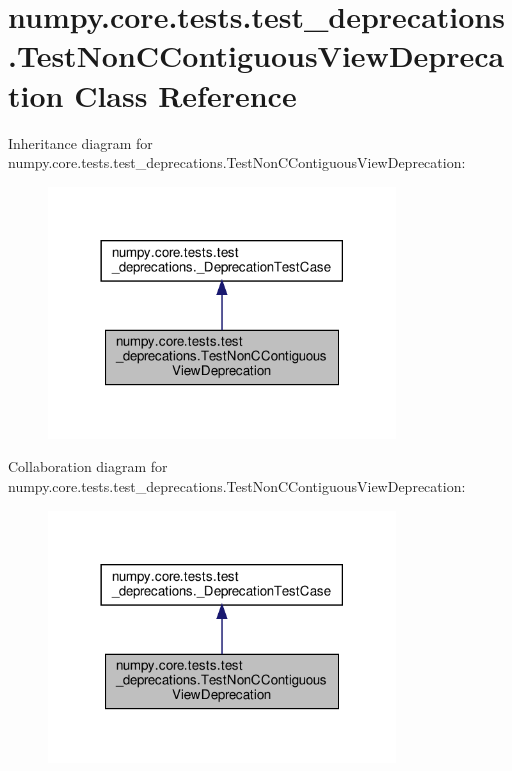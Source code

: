 \hypertarget{classnumpy_1_1core_1_1tests_1_1test__deprecations_1_1TestNonCContiguousViewDeprecation}{}\section{numpy.\+core.\+tests.\+test\+\_\+deprecations.\+Test\+Non\+C\+Contiguous\+View\+Deprecation Class Reference}
\label{classnumpy_1_1core_1_1tests_1_1test__deprecations_1_1TestNonCContiguousViewDeprecation}


Inheritance diagram for numpy.\+core.\+tests.\+test\+\_\+deprecations.\+Test\+Non\+C\+Contiguous\+View\+Deprecation\+:
\nopagebreak
\begin{figure}[H]
\begin{center}
\leavevmode
\includegraphics[width=261pt]{classnumpy_1_1core_1_1tests_1_1test__deprecations_1_1TestNonCContiguousViewDeprecation__inherit__graph}
\end{center}
\end{figure}


Collaboration diagram for numpy.\+core.\+tests.\+test\+\_\+deprecations.\+Test\+Non\+C\+Contiguous\+View\+Deprecation\+:
\nopagebreak
\begin{figure}[H]
\begin{center}
\leavevmode
\includegraphics[width=261pt]{classnumpy_1_1core_1_1tests_1_1test__deprecations_1_1TestNonCContiguousViewDeprecation__coll__graph}
\end{center}
\end{figure}
